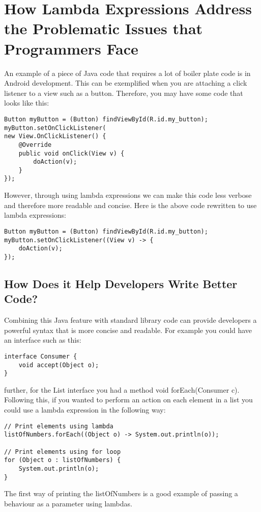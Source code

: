 \documentclass[twocolumn,notitlepage]{report}
\begin{document}
\section*{How Lambda Expressions Address the Problematic Issues that Programmers Face}
An example of a piece of Java code that requires a lot of boiler plate code is
in Android development. This can be exemplified when you are attaching a click
listener to a view such as a button. Therefore, you may have some code that
looks like this:
\begin{lstlisting}
Button myButton = (Button) findViewById(R.id.my_button);
myButton.setOnClickListener(
new View.OnClickListener() {
	@Override
	public void onClick(View v) {
		doAction(v);
	}
});
\end{lstlisting}
However, through using lambda expressions we can make this code less verbose
and therefore more readable and concise. Here is the above code rewritten to
use lambda expressions:
\newpage
\begin{lstlisting}
Button myButton = (Button) findViewById(R.id.my_button);
myButton.setOnClickListener((View v) -> {
	doAction(v);
});
\end{lstlisting}

\subsection*{How Does it Help Developers Write Better Code?}
Combining this Java feature with standard library code can provide developers a powerful syntax 
that is more concise and readable. For example you could have an interface such as this:
\begin{lstlisting}
interface Consumer {
	void accept(Object o);
}
\end{lstlisting}
further, for the {\ttfamily List} interface you had a method {\ttfamily void
forEach(Consumer c)}.  Following this, if you wanted to perform an action on
each element in a list you could use a lambda expression in the following way:
\begin{lstlisting}
// Print elements using lambda
listOfNumbers.forEach((Object o) -> System.out.println(o));

// Print elements using for loop
for (Object o : listOfNumbers) {
	System.out.println(o);
}
\end{lstlisting}
The first way of printing the listOfNumbers is a good example of passing a
behaviour as a parameter using
lambdas.\cite{website:why-we-need-lambda-expressions-in-java}\\
\end{document}
